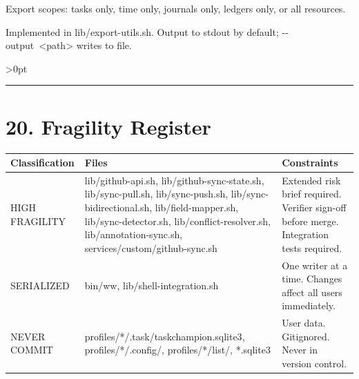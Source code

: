 \documentclass[11pt, a4paper, DIV=14]{scrartcl}
\renewcommand{\texttt}[1]{{\ttfamily\fontsize{8.5}{10.5}\selectfont\color{BabbNavy}#1}}
\newcounter{none}
\let\origRule\rule
\renewcommand{\rule}[3][0pt]{%
  \ifnum\dimexpr#3\relax>0pt
    \par\vspace{2pt}\noindent{\color{BabbBorder}\origRule[#1]{#2}{#3}}\par\vspace{2pt}%
  \else
    \origRule[#1]{#2}{#3}%
  \fi
}
\begin{document}
Export scopes: tasks only, time only, journals only, ledgers only, or
all resources.

Implemented in \texttt{lib/export-utils.sh}. Output to stdout by
default; \texttt{-\/-output\ \textless{}path\textgreater{}} writes to
file.

\begin{center}\rule{0.5\linewidth}{0.5pt}\end{center}

\section{20. Fragility Register}\label{fragility-register}

{\def\LTcaptype{none} %
\begin{longtable}[]{@{}
  >{\raggedright\arraybackslash}p{}
  >{\raggedright\arraybackslash}p{}
  >{\raggedright\arraybackslash}p{}@{}}
\toprule\noalign{}
\begin{minipage}[b]{\linewidth}\raggedright
Classification
\end{minipage} & \begin{minipage}[b]{\linewidth}\raggedright
Files
\end{minipage} & \begin{minipage}[b]{\linewidth}\raggedright
Constraints
\end{minipage} \\
\midrule\noalign{}
\endhead
\bottomrule\noalign{}
\endlastfoot
HIGH FRAGILITY & \texttt{lib/github-api.sh},
\texttt{lib/github-sync-state.sh}, \texttt{lib/sync-pull.sh},
\texttt{lib/sync-push.sh}, \texttt{lib/sync-bidirectional.sh},
\texttt{lib/field-mapper.sh}, \texttt{lib/sync-detector.sh},
\texttt{lib/conflict-resolver.sh}, \texttt{lib/annotation-sync.sh},
\texttt{services/custom/github-sync.sh} & Extended risk brief required.
Verifier sign-off before merge. Integration tests required. \\
SERIALIZED & \texttt{bin/ww}, \texttt{lib/shell-integration.sh} & One
writer at a time. Changes affect all users immediately. \\
NEVER COMMIT & \texttt{profiles/*/.task/taskchampion.sqlite3},
\texttt{profiles/*/.config/}, \texttt{profiles/*/list/},
\texttt{*.sqlite3} & User data. Gitignored. Never in version control. \\
\end{longtable}
}
\end{document}
